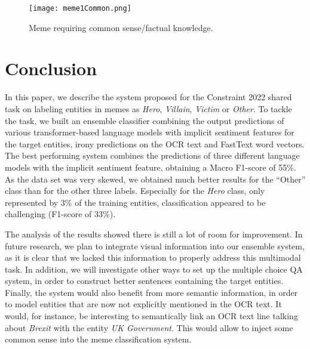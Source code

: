 \documentclass[11pt]{article}
\begin{document}
\begin{figure}[h!]
    \texttt{[image: meme1Common.png]}
    \caption{Meme requiring common sense/factual knowledge.}
    \label{melania}
\end{figure}

\section{Conclusion}

In this paper, we describe the system proposed for the Constraint 2022 shared task on labeling entities in memes as \emph{Hero}, \emph{Villain}, \emph{Victim} or \emph{Other}. To tackle the task, we built an ensemble classifier combining the output predictions of various transformer-based language models with implicit sentiment features for the target entities, irony predictions on the OCR text and FastText word vectors. 
The best performing system combines the predictions of three different language models with the implicit sentiment feature, obtaining a Macro F1-score of 55\%. As the data set was very skewed, we obtained much better results for the ``Other'' class than for the other three labels. Especially for the \emph{Hero} class, only represented by 3\% of the training entities, classification appeared to be challenging (F1-score of 33\%).

The analysis of the results showed there is still a lot of room for improvement. In future research, we plan to integrate visual information into our ensemble system, as it is clear that we lacked this information to properly address this multimodal task.
In addition, we will investigate other ways to set up the multiple choice QA system, in order to construct better sentences containing the target entities.
Finally, the system would also benefit from more semantic information, in order to model entities that are now not explicitly mentioned in the OCR text. It would, for instance, be interesting to semantically link an OCR text line talking about \emph{Brexit} with the entity \emph{UK Government}. This would allow to inject some common sense into the meme classification system.


\end{document}
